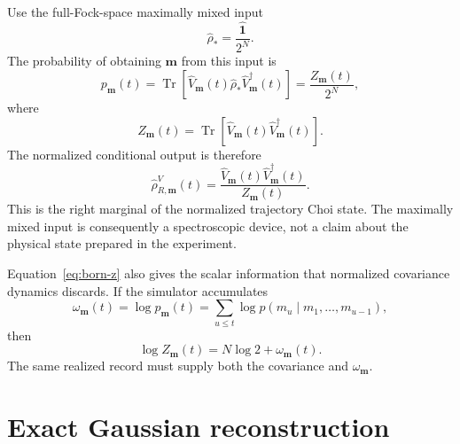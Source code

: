 \documentclass[aps,prb,twocolumn,floatfix,nofootinbib,superscriptaddress]{revtex4-2}
\newcommand{\Tr}{\operatorname{Tr}}
\begin{document}
Use the full-Fock-space maximally mixed input
\begin{equation}
 \hat\rho_*=\frac{\hat{\mathbf{1}}}{2^N}.
 \label{eq:maxmix}
\end{equation}
The probability of obtaining \(\boldsymbol m\) from this input is
\begin{equation}
 p_{\boldsymbol m}(t)
 =\Tr\!\left[
 \hat V_{\boldsymbol m}(t)\hat\rho_*\hat V_{\boldsymbol m}^{\dagger}(t)
 \right]
 =\frac{Z_{\boldsymbol m}(t)}{2^N},
 \label{eq:born-z}
\end{equation}
where
\begin{equation}
 Z_{\boldsymbol m}(t)
 =\Tr\!\left[
 \hat V_{\boldsymbol m}(t)\hat V_{\boldsymbol m}^{\dagger}(t)
 \right].
 \label{eq:zk}
\end{equation}
The normalized conditional output is therefore
\begin{equation}
 \hat\rho^V_{R,\boldsymbol m}(t)
 =\frac{
 \hat V_{\boldsymbol m}(t)\hat V_{\boldsymbol m}^{\dagger}(t)
 }{Z_{\boldsymbol m}(t)}.
 \label{eq:right-choi}
\end{equation}
This is the right marginal of the normalized trajectory Choi state.  The maximally mixed input is consequently a spectroscopic device, not a claim about the physical state prepared in the experiment.

Equation~\eqref{eq:born-z} also gives the scalar information that normalized covariance dynamics discards.  If the simulator accumulates
\begin{equation}
 \omega_{\boldsymbol m}(t)=\log p_{\boldsymbol m}(t)
 =\sum_{u\leq t}\log p(m_u\mid m_1,\ldots,m_{u-1}),
 \label{eq:logweight}
\end{equation}
then
\begin{equation}
 \boxed{\log Z_{\boldsymbol m}(t)=N\log 2+\omega_{\boldsymbol m}(t).}
 \label{eq:logz}
\end{equation}
The same realized record must supply both the covariance and \(\omega_{\boldsymbol m}\).

\section{Exact Gaussian reconstruction}
\end{document}
